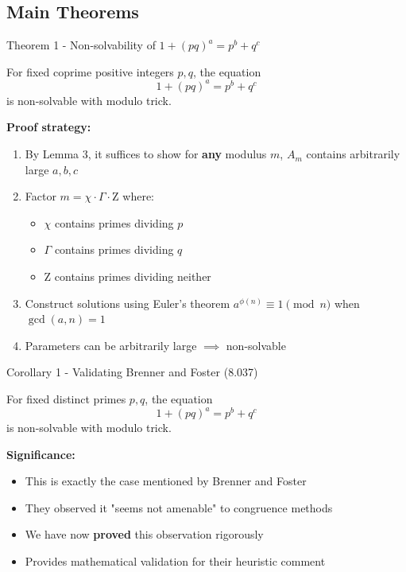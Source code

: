 \subsection{Main Theorems}

\begin{frame}{Theorem 1 - Non-solvability of $1+(pq)^a = p^b + q^c$}
    \begin{theorems}
        For fixed coprime positive integers $p,q$, the equation
        \[1+(pq)^a = p^b + q^c\]
        is non-solvable with modulo trick.
    \end{theorems}

    \textbf{Proof strategy:}
    \begin{enumerate}
        \item By Lemma 3, it suffices to show for \textbf{any} modulus $m$, $A_m$ contains arbitrarily large $a,b,c$
        \item Factor $m = \chi \cdot \Gamma \cdot \mathrm{Z}$ where:
            \begin{itemize}
                \item $\chi$ contains primes dividing $p$
                \item $\Gamma$ contains primes dividing $q$
                \item $\mathrm{Z}$ contains primes dividing neither
            \end{itemize}
        \item Construct solutions using Euler's theorem $a^{\phi(n)} \equiv 1 \pmod n$ when $\gcd(a,n)=1$
        \item Parameters can be arbitrarily large $\implies$ non-solvable
    \end{enumerate}
\end{frame}

\begin{frame}{Corollary 1 - Validating Brenner and Foster (8.037)}
    \begin{corollarys}
        For fixed distinct primes $p,q$, the equation
        \[1+(pq)^a = p^b + q^c\]
        is non-solvable with modulo trick.
    \end{corollarys}
    
    \vspace{0.3cm}
    \textbf{Significance:}
    \begin{itemize}
        \item This is exactly the case mentioned by Brenner and Foster
        \item They observed it "seems not amenable" to congruence methods
        \item We have now \textbf{proved} this observation rigorously
        \item Provides mathematical validation for their heuristic comment
    \end{itemize}
\end{frame}

